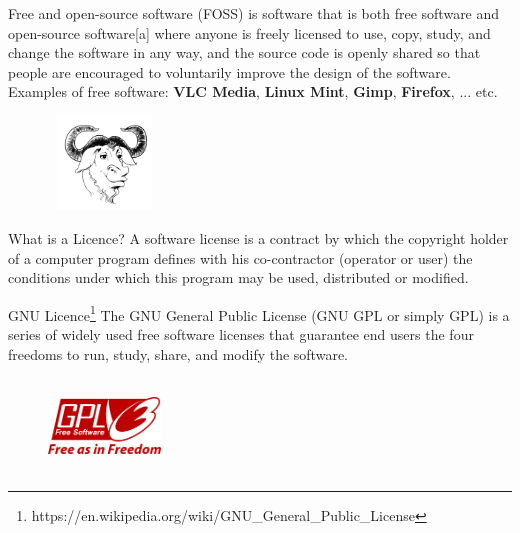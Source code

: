 \begin{frame}
  Free and open-source software (FOSS) is software that is both free software and open-source software[a] where anyone is freely licensed to use, copy, study, and change the software in any way, and the source code is openly shared so that people are encouraged to voluntarily improve the design of the software.
  \pause \\
  Examples of free software: \textbf{VLC Media}, \textbf{Linux Mint}, \textbf{Gimp}, \textbf{Firefox}, ... etc.

\vspace{1cm}
\begin{figure}
\includegraphics[width=3cm,height=2.5cm,keepaspectratio]{img/gnu.png}
\end{figure}

\end{frame}
\begin{frame}{What is a Licence?}
  A software license is a contract by which the copyright holder of a computer program defines with his co-contractor (operator or user) the conditions under which this program may be used, distributed or modified.
\end{frame}
\begin{frame}{GNU Licence\footnote{https://en.wikipedia.org/wiki/GNU\_General\_Public\_License}}
  The GNU General Public License (GNU GPL or simply GPL) is a series of widely used free software licenses that guarantee end users the four freedoms to run, study, share, and modify the software.

\pause
\vspace{1cm}
\begin{figure}
\includegraphics[width=3cm,height=2.5cm,keepaspectratio]{img/GPLv3.png}
\end{figure}

\end{frame}
